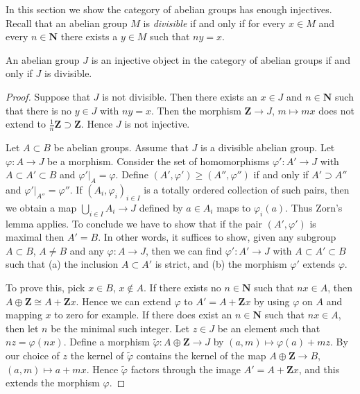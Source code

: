 \noindent
In this section we show the category of abelian groups has enough
injectives. Recall that an abelian group $M$ is {\it divisible}
if and only if for every $x \in M$ and every $n \in \mathbf{N}$
there exists a $y \in M$ such that $n y = x$.

\begin{lemma}
\label{lemma-injective-abelian}
An abelian group $J$ is an injective object in
the category of abelian groups if and only if $J$
is divisible.
\end{lemma}

\begin{proof}
Suppose that $J$ is not divisible. Then there exists
an $x \in J$ and $n \in \mathbf{N}$ such that there
is no $y \in J$ with $n y = x$. Then the morphism
$\mathbf{Z} \to J$, $m \mapsto mx$ does not extend
to $\frac{1}{n}\mathbf{Z} \supset \mathbf{Z}$. Hence
$J$ is not injective.

\medskip\noindent
Let $A \subset B$ be abelian groups.
Assume that $J$ is a divisible abelian group.
Let $\varphi : A \to J$ be a morphism.
Consider the set of homomorphisms $\varphi' : A' \to J$
with $A \subset A' \subset B$ and $\varphi'|_A = \varphi$.
Define $(A', \varphi') \geq (A'', \varphi'')$ if
and only if $A' \supset A''$ and $\varphi'|_{A''} = \varphi''$.
If $(A_i, \varphi_i)_{i \in I}$ is a totally
ordered collection of such pairs, then we obtain a map
$\bigcup_{i \in I} A_i \to J$ defined by $a \in A_i$
maps to $\varphi_i(a)$. Thus Zorn's lemma applies.
To conclude we have to show that if the pair
$(A', \varphi')$ is maximal then $A' = B$.
In other words, it suffices to show, given
any subgroup $A \subset B$, $A \not = B$ and
any $\varphi : A \to J$, then we can find
$\varphi' : A' \to J$ with $A \subset A' \subset B$
such that (a) the inclusion $A \subset A'$ is strict, and
(b) the morphism $\varphi'$ extends $\varphi$.

\medskip\noindent
To prove this, pick $x \in B$, $x \not \in A$.
If there exists no $n\in \mathbf{N}$ such that
$nx \in A$, then $A \oplus \mathbf{Z} \cong A + \mathbf{Z}x$.
Hence we can extend $\varphi$ to $A' = A + \mathbf{Z}x$
by using $\varphi$ on $A$ and mapping $x$ to zero for example.
If there does exist an $n \in \mathbf{N}$ such that
$nx \in A$, then let $n$ be the minimal such integer.
Let $z \in J$ be an element such that $nz = \varphi(nx)$.
Define a morphism $\tilde\varphi : A \oplus \mathbf{Z} \to J$ by
$(a, m) \mapsto \varphi(a) + mz$. By our choice of
$z$ the kernel of $\tilde \varphi$ contains the kernel
of the map $A \oplus \mathbf{Z} \to B$,
$(a, m) \mapsto a + mx$. Hence $\tilde \varphi$ factors
through the image $A' = A + \mathbf{Z}x$, and this extends the morphism
$\varphi$.
\end{proof}

